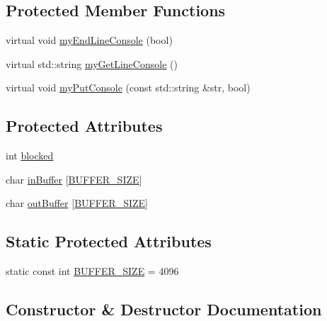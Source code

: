 \subsection*{Protected Member Functions}
\begin{DoxyCompactItemize}
\item 
virtual void \mbox{\hyperlink{classstanfordcpplib_1_1qtgui_1_1ConsoleStreambufQt_aab6a7af5dac69a7c773d3aae3074696e}{my\+End\+Line\+Console}} (bool)
\item 
virtual std\+::string \mbox{\hyperlink{classstanfordcpplib_1_1qtgui_1_1ConsoleStreambufQt_ab5fb2275a81dbd1c170c37bc48adf08a}{my\+Get\+Line\+Console}} ()
\item 
virtual void \mbox{\hyperlink{classstanfordcpplib_1_1qtgui_1_1ConsoleStreambufQt_aa8582bd55e3d7fc8860ca9c87efe3dea}{my\+Put\+Console}} (const std\+::string \&str, bool)
\end{DoxyCompactItemize}
\subsection*{Protected Attributes}
\begin{DoxyCompactItemize}
\item 
int \mbox{\hyperlink{classstanfordcpplib_1_1ConsoleStreambuf_ac74e3d5a1b1eeb5c8e32867ad62823f0}{blocked}}
\item 
char \mbox{\hyperlink{classstanfordcpplib_1_1ConsoleStreambuf_a6dfeba2ed7f89c327dd07f6136b2a256}{in\+Buffer}} \mbox{[}\mbox{\hyperlink{classstanfordcpplib_1_1ConsoleStreambuf_a91f806c1bc7c1f4f402a627773840252}{B\+U\+F\+F\+E\+R\+\_\+\+S\+I\+ZE}}\mbox{]}
\item 
char \mbox{\hyperlink{classstanfordcpplib_1_1ConsoleStreambuf_a015231cbe2f7737eee637ddee666f1dd}{out\+Buffer}} \mbox{[}\mbox{\hyperlink{classstanfordcpplib_1_1ConsoleStreambuf_a91f806c1bc7c1f4f402a627773840252}{B\+U\+F\+F\+E\+R\+\_\+\+S\+I\+ZE}}\mbox{]}
\end{DoxyCompactItemize}
\subsection*{Static Protected Attributes}
\begin{DoxyCompactItemize}
\item 
static const int \mbox{\hyperlink{classstanfordcpplib_1_1ConsoleStreambuf_a91f806c1bc7c1f4f402a627773840252}{B\+U\+F\+F\+E\+R\+\_\+\+S\+I\+ZE}} = 4096
\end{DoxyCompactItemize}


\subsection{Constructor \& Destructor Documentation}
\mbox{\label{classstanfordcpplib_1_1qtgui_1_1ConsoleStreambufQt_a98660042e1f344d995a0e2e80daee3e9}} 
